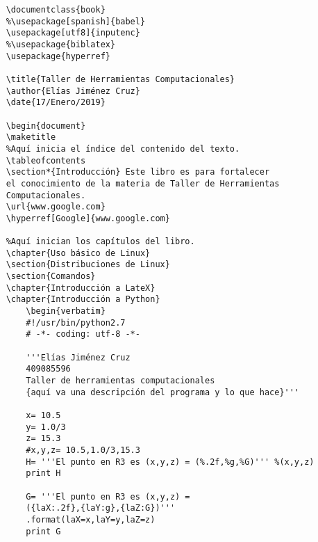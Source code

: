 \documentclass[letterpaper, 12pt, oneside]{article} %
\begin{document}
	\begin{verbatim}
	\documentclass{book}
	%\usepackage[spanish]{babel}
	\usepackage[utf8]{inputenc}
	%\usepackage{biblatex}
	\usepackage{hyperref}
	
	\title{Taller de Herramientas Computacionales}
	\author{Elías Jiménez Cruz}
	\date{17/Enero/2019}
	
	\begin{document}
	\maketitle
	%Aquí inicia el índice del contenido del texto.
	\tableofcontents
	\section*{Introducción} Este libro es para fortalecer 
	el conocimiento de la materia de Taller de Herramientas 
	Computacionales.
	\url{www.google.com}
	\hyperref[Google]{www.google.com}
	
	%Aquí inician los capítulos del libro.
	\chapter{Uso básico de Linux}
	\section{Distribuciones de Linux}
	\section{Comandos}
	\chapter{Introducción a LateX}
	\chapter{Introducción a Python}
		\begin{verbatim}
		#!/usr/bin/python2.7
		# -*- coding: utf-8 -*-
		
		'''Elías Jiménez Cruz
		409085596
		Taller de herramientas computacionales
		{aquí va una descripción del programa y lo que hace}'''
		
		x= 10.5
		y= 1.0/3
		z= 15.3
		#x,y,z= 10.5,1.0/3,15.3
		H= '''El punto en R3 es (x,y,z) = (%.2f,%g,%G)''' %(x,y,z)
		print H
		
		G= '''El punto en R3 es (x,y,z) = 
		({laX:.2f},{laY:g},{laZ:G})''' 
		.format(laX=x,laY=y,laZ=z)
		print G
		

\end{verbatim}
\end{document}
